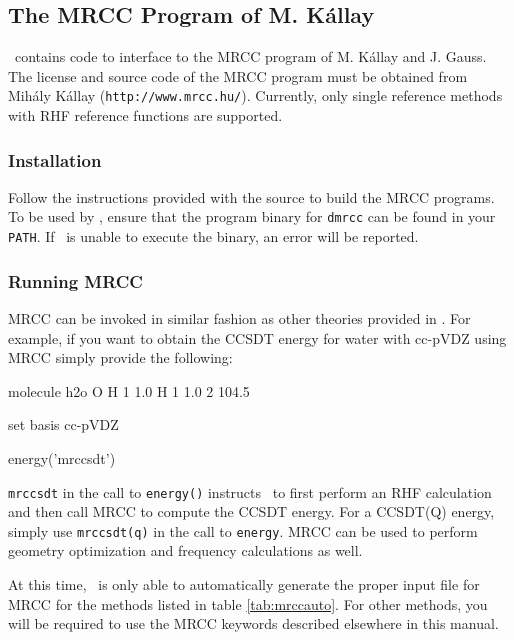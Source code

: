 \subsection{The MRCC Program of M. K\'{a}llay} \label{mrcc}
\PSIfour\ contains code to interface to the MRCC program of M. K\'{a}llay
and J. Gauss.  The license and source code of the MRCC program must be
obtained from Mih\'{a}ly K\'{a}llay ({\tt http://www.mrcc.hu/}). Currently, only single reference methods with RHF reference functions are supported.
\renewcommand{\optionname}[2]{\texttt{\nameref{op-#2-#1}}}

\subsubsection{Installation}
Follow the instructions provided with the source to build the MRCC programs. To be used by \PSIfour, ensure that the program binary for {\tt dmrcc} can be found in your {\tt PATH}. If \PSIfour\ is unable to execute the binary, an error will be reported.

\subsubsection{Running MRCC}
MRCC can be invoked in similar fashion as other theories provided in \PSIfour. For example, if you want to obtain the CCSDT energy for water with cc-pVDZ using MRCC simply provide the following:

\begin{Snippet}
molecule h2o {
    O
    H 1 1.0
    H 1 1.0 2 104.5
}

set {
    basis cc-pVDZ
}

energy('mrccsdt')
\end{Snippet}

{\tt mrccsdt} in the call to {\tt energy()} instructs \PSIfour\ to first perform an RHF calculation and then call MRCC to compute the CCSDT energy. For a CCSDT(Q) energy, simply use {\tt mrccsdt(q)} in the call to {\tt energy}.  MRCC can be used to perform geometry optimization and frequency calculations as well.

At this time, \PSIfour\ is only able to automatically generate the proper
input file for MRCC for the methods listed in table \ref{tab:mrccauto}. For other methods, you will be required to use the MRCC keywords described elsewhere in this manual.

